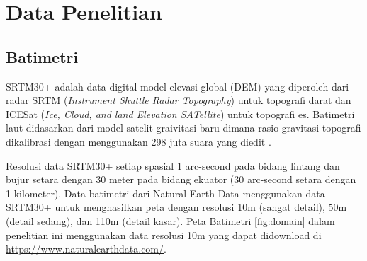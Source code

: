 \section[Data Penelitian]{Data Penelitian}
\begin{spacing}{1.5}
\vspace{-1pc}
\subsection[Batimetri]{Batimetri}
	SRTM30+ adalah data digital model elevasi global (DEM) yang diperoleh dari radar SRTM (\textit{Instrument Shuttle Radar Topography}) untuk topografi darat dan ICESat (\textit{Ice, Cloud, and land Elevation SATellite}) untuk topografi es. Batimetri laut didasarkan dari model satelit graivitasi baru dimana rasio gravitasi-topografi dikalibrasi dengan menggunakan 298 juta suara yang diedit .
	\par Resolusi data SRTM30+ setiap spasial 1 arc-second pada bidang lintang dan bujur setara dengan 30 meter pada bidang ekuator (30 arc-second setara dengan 1 kilometer). Data batimetri dari Natural Earth Data menggunakan data SRTM30+ untuk menghasilkan peta dengan resolusi 10m (sangat detail), 50m (detail sedang), dan 110m (detail kasar). Peta Batimetri \ref{fig:domain} dalam penelitian ini menggunakan data resolusi 10m yang dapat didownload di \href{https://www.naturalearthdata.com/downloads/10m-physical-vectors/10m-bathymetry/}{https://www.naturalearthdata.com/}.

\end{spacing}
